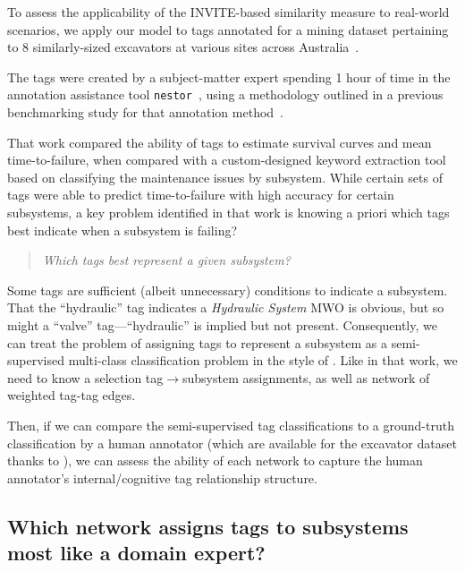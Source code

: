 \documentclass[%
	12pt,
		oneside,
		letterpaper
]{book}
\begin{document}
To assess the applicability of the INVITE-based similarity measure to real-world scenarios, we apply our model to tags annotated for a mining dataset pertaining to 8 similarly-sized excavators at various sites across Australia~\autocite{Whyautonomousassets_Hodkiewicz2017,Cleaninghistoricalmaintenance_Hodkiewicz2016}.

The tags were created by a subject-matter expert spending 1 hour of time in the annotation assistance tool \texttt{nestor}~\autocite{NestorToolNatural_Sexton2019}, using a methodology outlined in a previous benchmarking study for that annotation method~\autocite{BenchmarkingKeywordExtraction_Sexton2018}.

That work compared the ability of tags to estimate survival curves and mean time-to-failure, when compared with a custom-designed keyword extraction tool based on classifying the maintenance issues by subsystem.
While certain sets of tags were able to predict time-to-failure with high accuracy for certain subsystems, a key problem identified in that work is knowing a priori which tags best indicate when a subsystem is failing?

\begin{quote}
\emph{Which tags best represent a given subsystem?}
\end{quote}

Some tags are sufficient (albeit unnecessary) conditions to indicate a subsystem.
That the ``hydraulic'' tag indicates a \emph{Hydraulic System} MWO is obvious, but so might a ``valve'' tag---``hydraulic'' is implied but not present.
Consequently, we can treat the problem of assigning tags to represent a subsystem as a semi-supervised multi-class classification problem in the style of \textcite{Semisupervisedlearning_Avrachenkov2017}.
Like in that work, we need to know a selection tag\(\rightarrow\)subsystem assignments, as well as network of weighted tag-tag edges.

Then, if we can compare the semi-supervised tag classifications to a ground-truth classification by a human annotator (which are available for the excavator dataset thanks to \textcite{sharedreliabilitydatabase_Ho2015}), we can assess the ability of each network to capture the human annotator's internal/cognitive tag relationship structure.

\subsection{Which network assigns tags to subsystems most like a domain expert?}\label{which-network-assigns-tags-to-subsystems-most-like-a-domain-expert}
\end{document}
